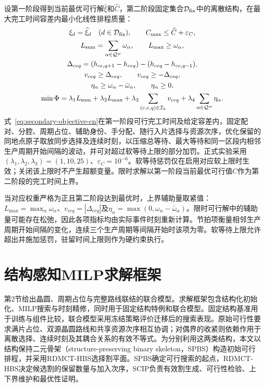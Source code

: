 \documentclass[final,5p,times,twocolumn]{elsarticle}
\newcommand{\method}{RDMCT-HBS}
\begin{document}
设第一阶段得到当前最优可行解$\widehat\xi$和$\widehat C$，第二阶段固定集合$\mathcal D_{\rm fix}$中的离散结构，在最大完工时间容差内最小化线性排程质量：
\begin{equation}
\begin{gathered}
\xi_d=\widehat\xi_d\quad(d\in\mathcal D_{\rm fix}),\qquad
C_{\max}\le\widehat C+\varepsilon_C,\\
L_{\rm sum}=\sum_{\alpha\in\mathcal Q^w}\omega_\alpha,\qquad
L_{\max}\ge\omega_\alpha,\\
\Delta_{ceq}=(h_{ce,q+1}-h_{ceq})-(h_{ceq}-h_{ce,q-1}),\\
v_{ceq}\ge\Delta_{ceq},\qquad v_{ceq}\ge-\Delta_{ceq},\\
\eta_\alpha\ge\omega_\alpha-\bar\omega_\alpha,\qquad
\eta_\alpha\ge0,\\
\min\Phi=\lambda_1L_{\rm sum}+\lambda_2L_{\max}
+\lambda_3\sum_{(c,e,q)\in\mathcal I_h}v_{ceq}
+\lambda_4\sum_{\alpha\in\mathcal Q^w}\eta_\alpha.
\end{gathered}
\label{eq:secondary-objective-cn}
\end{equation}
式~\eqref{eq:secondary-objective-cn}在第一阶段可行完工时间及给定容差内，固定配对、分腔、周期占位、辅助身份、手分配、随行入片选择与资源次序，优化保留的同地点原子取放同步选择及连续时刻，以压缩总等待、最大等待和同一区段内相邻生产周期开始间隔的波动，并可对超过软等待上限的部分加罚。正式实验采用$(\lambda_1,\lambda_2,\lambda_3)=(1,10,25)$、$\varepsilon_C=10^{-6}$。软等待惩罚仅在启用对应软上限时生效；关闭该上限时不产生超额变量。限时求解以第一阶段当前最优可行值$\widehat C$作为第二阶段的完工时间上界。

当对应权重严格为正且第二阶段达到最优时，上界辅助量取紧值：$L_{\max}=\max_\alpha\omega_\alpha$、$v_{ceq}=|\Delta_{ceq}|$及$\eta_\alpha=\max(0,\omega_\alpha-\bar\omega_\alpha)$。限时可行解中的辅助量可能存在松弛，因此各项指标均由实际事件时刻重新计算。节拍项衡量相邻生产周期开始间隔的变化，连续三个生产周期等间隔开始时该项为零。软等待上限允许超出并施加惩罚，驻留时间上限则作为硬约束执行。

\section{结构感知MILP求解框架}

第2节给出晶圆、周期占位与完整路线联结的联合模型。求解框架包含结构化初始化、MILP搜索与时刻精修，同时用于固定结构特例和联合模型。固定结构基准用于训练与组件比较，联合模型采用冻结策略评价迁移后的搜索表现。原始可行性要求满片占位、双源晶圆路线和共享资源次序相互协调；对偶界的收紧则依赖作用于离散选择、连续时刻及其耦合关系的有效不等式。为分别利用这两类结构，本文以结构保持二元骨架（structure-preserving binary skeleton，SPBS）构造初始可行排程，并采用\method{}选择割平面。SPBS确定可行搜索的起点，\method{}决定候选割的保留数量与加入次序，SCIP负责有效割生成、可行性检验、上下界维护和最优性证明\citep{achterberg2009scip,bestuzheva2023scip}。
\end{document}
